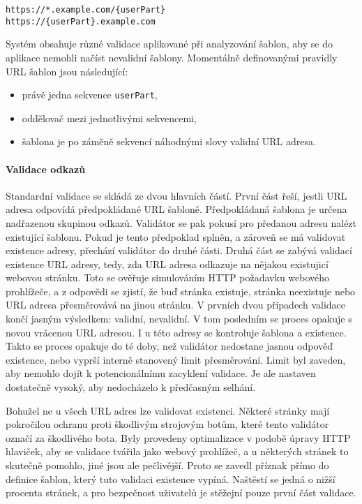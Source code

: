 			\begin{lstlisting}[caption={Ukázka šablon URL adres. Zdroj: [autor]}]
https://*.example.com/{userPart}
https://{userPart}.example.com
			\end{lstlisting}

			Systém obsahuje různé validace aplikované při analyzování šablon, aby se do aplikace nemohli načíst
			nevalidní šablony.
			Momentálně definovanými pravidly URL šablon jsou následující:
			\begin{itemize}
				\item právě jedna sekvence \lstinline{userPart},
				\item oddělovač mezi jednotlivými sekvencemi,
				\item šablona je po záměně sekvencí náhodnými slovy validní \ac{URL} adresa.
			\end{itemize}

			\paragraph{Validace odkazů}

			Standardní validace se skládá ze dvou hlavních částí.
			První část řeší, jestli \ac{URL} adresa odpovídá předpokládané \ac{URL} šabloně.
			Předpokládaná šablona je určena nadřazenou skupinou odkazů.
			Validátor se pak pokusí pro předanou adresu nalézt existující šablonu.
			Pokud je tento předpoklad splněn, a zároveň se má validovat existence adresy, přechází validátor do druhé části.
			Druhá část se zabývá validací existence \ac{URL} adresy, tedy, zda URL adresa odkazuje na nějakou existujicí
			webovou stránku.
			Toto se ověřuje simulováním \ac{HTTP} požadavku webového prohlížeče, a z odpovědi se zjistí, že buď stránka
			existuje, stránka neexistuje nebo \ac{URL} adresa přesměrovává na jinou stránku.
			V prvních dvou případech validace končí jasným výsledkem: validní, nevalidní.
			V tom posledním se proces opakuje s novou vrácenou \ac{URL} adresou.
			I u této adresy se kontroluje šablona a existence.
			Takto se proces opakuje do té doby, než validátor nedostane jasnou odpověď existence, nebo vyprší interně stanovený
			limit přesměrování.
			Limit byl zaveden, aby nemohlo dojít k potencionálnímu zacyklení validace.
			Je ale nastaven dostatečně vysoký, aby nedocházelo k předčasným selhání.


			Bohužel ne u všech \ac{URL} adres lze validovat existenci.
			Některé stránky mají pokročilou ochranu proti škodlivým strojovým botům, které tento validátor označí za
			škodlivého bota.
			Byly provedeny optimalizace v podobě úpravy \ac{HTTP} hlaviček, aby se validace tvářila jako webový prohlížeč,
			a u některých stránek to skutečně pomohlo, jiné jsou ale pečlivější.
			Proto se zavedl příznak přímo do definice šablon, který tuto validaci existence vypíná.
			Naštěstí se jedná o nižší procenta stránek, a pro bezpečnost uživatelů je stěžejní pouze první část validace.

